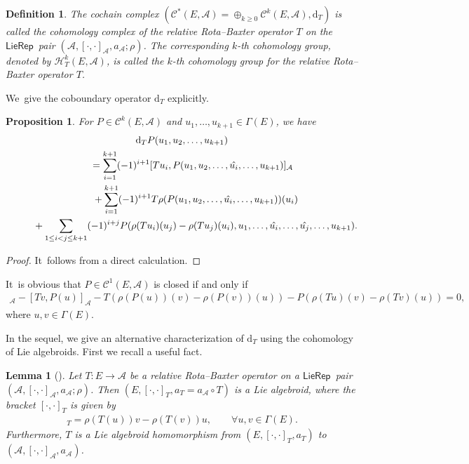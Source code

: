 \documentclass[pdftex]{sigma}%
\numberwithin{equation}{section}
\newtheorem{lem}[thm]{Lemma}
\newtheorem{pro}[thm]{Proposition}
\newtheorem{defi}[thm]{Definition}
\newcommand{\huaA}{\mathcal{A}}
\newcommand{\huaC}{\mathcal{C}}
\newcommand{\huaH}{\mathcal{H}}
\newcommand{\dM}{\mathrm{d}}
\newcommand{\LP}{$\mathsf{LieRep}$~}
\begin{document}
\begin{defi}\label{defi:cohomology of RB-operator}
The cochain complex $(\huaC^*(E,\huaA)=\oplus_{k\geq0}\huaC^k(E,\huaA),\dM_{T})$ is called
the {\it cohomology complex} of the relative Rota--Baxter operator $T$ on the \LP pair $(\huaA,[\cdot,\cdot]_\huaA,a_\huaA;\rho)$. The corresponding $k$-th cohomology group, denoted by $\huaH_{T}^k(E,\huaA)$, is called the {\it $k$-th cohomology group} for the relative Rota--Baxter operator $T$.
\end{defi}

We~give the coboundary operator $\dM_{T}$ explicitly.

\begin{pro}\label{pro:concret formula}
 For $P\in\huaC^k(E,\huaA)$ and $u_1,\dots,u_{k+1}\in\Gamma{(E)}$, we have
\begin{gather}
\dM_{T}P(u_1,u_2,\dots,u_{k+1})\nonumber
\\ \qquad
{}=\sum_{i=1}^{k+1}(-1)^{i+1}[Tu_i,P(u_1,u_2,\dots,\hat{u_i},\dots,u_{k+1})]_{\huaA}\nonumber
\\ \qquad\hphantom{=}
{}+\sum_{i=1}^{k+1}(-1)^{i+1}T\rho(P(u_1,u_2,\dots,\hat{u_i},\dots,u_{k+1}))(u_i)\nonumber
\\ \qquad\hphantom{=}
{}+\sum_{1\leq i<j\leq {k+1}}(-1)^{i+j}P(\rho(Tu_i)(u_j)-\rho(Tu_j)(u_i),u_1,\dots,\hat{u_i},\dots,\hat{u_j},\dots,u_{k+1}).
\label{eq:coboundary operator of RB-operator}
\end{gather}
\end{pro}

\begin{proof}
 It~follows from a direct calculation.
\end{proof}

It~is obvious that $P\in\huaC^1(E,\huaA)$ is closed if and only if
\begin{gather*}
[Tu,P(v)]_{\huaA}-[Tv,P(u)]_{\huaA}-T(\rho(P(u))(v)-\rho(P(v))(u))-P(\rho(Tu)(v)-\rho(Tv)(u))=0,
\end{gather*}
where $u,v\in\Gamma(E)$.

In the sequel, we give an alternative characterization of $\dM_{T}$ using the cohomology of Lie algebroids. First we recall a useful fact.

\begin{lem}[\cite{LiuShengBaiChen}]\label{lem:new Lie algebroid}
 Let $T\colon E\longrightarrow \huaA$ be a relative Rota--Baxter operator on a \LP pair $(\huaA,[\cdot,\cdot]_\huaA,a_\huaA;\rho)$. Then $(E,[\cdot,\cdot]_T,a_T=a_\huaA\circ T)$ is a Lie algebroid, where the bracket $[\cdot,\cdot]_T$ is given by
 \begin{gather*}
 [u,v]_T=\rho(T(u))v-\rho(T(v))u,\qquad\forall u,v\in\Gamma(E).
 \end{gather*}
 Furthermore, $T$ is a Lie algebroid homomorphism from $(E,[\cdot,\cdot]_T,a_T)$ to $(\huaA,[\cdot,\cdot]_\huaA,a_\huaA)$.
\end{lem}
\end{document}
